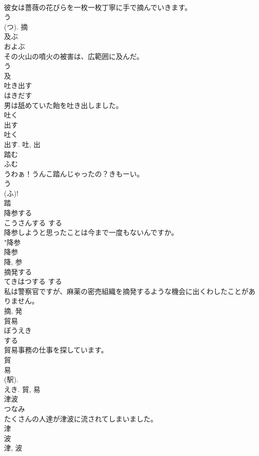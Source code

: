 \documentclass[8pt]{extreport}
\begin{document}
\begin{CJK}{UTF8}{min}
\\	彼女は薔薇の花びらを一枚一枚丁寧に手で摘んでいきます。	
\\	う 
\\	(つ).	摘	
\\	及ぶ	
\\	およぶ	
\\	その火山の噴火の被害は、広範囲に及んだ。	
\\	う 
\\	及	
\\	吐き出す	
\\	はきだす	
\\	男は舐めていた飴を吐き出しました。	
\\	吐く 
\\	出す 
\\	吐く 
\\	出す.	吐, 出	
\\	踏む	
\\	ふむ	
\\	うわぁ！うんこ踏んじゃったの？きもーい。	
\\	う 
\\	(ふ)! 
\\	踏	
\\	降参する	
\\	こうさんする	する 
\\	降参しようと思ったことは今まで一度もないんですか。	
\\	"降参 
\\	降参 
\\	降, 参	
\\	摘発する	
\\	てきはつする	する 
\\	私は警察官ですが、麻薬の密売組織を摘発するような機会に出くわしたことがありません。	
\\	摘, 発	
\\	貿易	
\\	ぼうえき	
\\	する 
\\	貿易事務の仕事を探しています。	
\\	貿 
\\	易 
\\	(駅). 
\\	えき.	貿, 易	
\\	津波	
\\	つなみ	
\\	たくさんの人達が津波に流されてしまいました。	
\\	津 
\\	波 
\\	津, 波	

\end{CJK}
\end{document}
